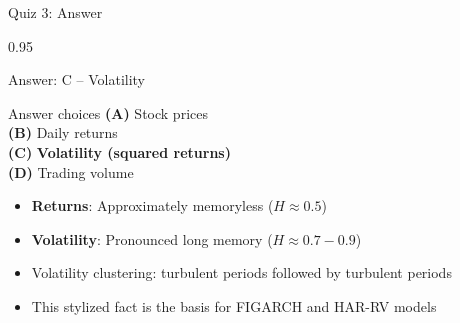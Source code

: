 \documentclass[9pt, aspectratio=169, t]{beamer}
\begin{document}
\begin{frame}{Quiz 3: Answer}
    \begin{cminipage}{0.95\textwidth}
    {\small
    \begin{exampleblock}{Answer: C -- Volatility}
    \begin{block}{Answer choices}
        \textcolor{MainBlue}{\textbf{(A)}} Stock prices \incorrect\\[2pt]
        \textcolor{MainBlue}{\textbf{(B)}} Daily returns \incorrect\\[2pt]
        \textcolor{MainBlue}{\textbf{(C)}} \textbf{\textcolor{Forest}{Volatility (squared returns)}} \correct\\[2pt]
        \textcolor{MainBlue}{\textbf{(D)}} Trading volume \incorrect
    \end{block}

        \vspace{0.1cm}

        \begin{itemize}\setlength{\itemsep}{0pt}
            \item \textbf{Returns}: Approximately memoryless ($H \approx 0.5$)
            \item \textbf{Volatility}: Pronounced long memory ($H \approx 0.7-0.9$)
            \item Volatility clustering: turbulent periods followed by turbulent periods
            \item This stylized fact is the basis for FIGARCH and HAR-RV models
        \end{itemize}
    \end{exampleblock}
    }
    \end{cminipage}
\end{frame}
\end{document}
